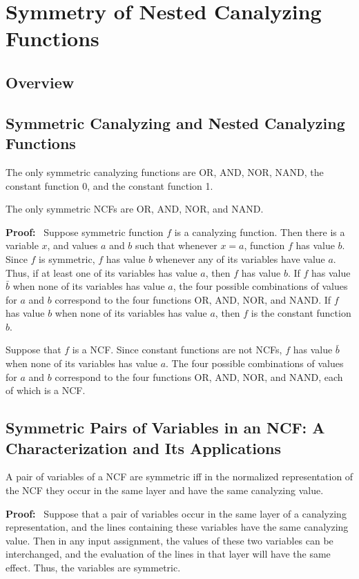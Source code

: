 \section{Symmetry of Nested Canalyzing Functions}
\label{sse:ncf_and_symmetry}

\subsection{Overview}
\label{sse:res_overview}


\subsection{Symmetric Canalyzing and Nested Canalyzing Functions}
\label{sse:sym_and_cf_ncf}

\begin{theorem}\label{thm:ncf_symmetric}
The only symmetric canalyzing functions are OR, AND, NOR, NAND, 
the constant function 0, and the constant function 1.

The only symmetric NCFs are OR, AND, NOR, and NAND.
\end{theorem}
\noindent
\textbf{Proof:}~
Suppose symmetric function $f$ is a canalyzing function. Then there
is a variable $x$, and values $a$ and $b$ such that whenever $x =
a$, function $f$ has value $b$.  Since $f$ is symmetric, $f$  has
value $b$ whenever any of its variables have value $a$.  Thus, if
at least one of its variables has value $a$, then $f$ has value
$b$.  If $f$ has value $\bar{b}$ when none of its variables has
value $a$, the four possible combinations of values for $a$ and $b$
correspond to the four functions OR, AND, NOR, and NAND.  If $f$
has value $b$ when none of its variables has value $a$, then $f$
is the constant function $b$.

Suppose that $f$ is a NCF.  Since constant functions are not NCFs,
$f$ has value $\bar{b}$ when none of its variables has value $a$.
The four possible combinations of values for $a$ and $b$ correspond
to the four functions OR, AND, NOR, and NAND, each of which is a
NCF.  \QED

\subsection{Symmetric Pairs of Variables in an NCF: A Characterization
and Its Applications}
\label{sse:ncf_strong_sym}

\begin{theorem}\label{thm:ncf_symmetric_variables}
A pair of variables of a NCF are symmetric iff
in the normalized representation of the NCF
they occur in the same layer and have the same canalyzing value.
\end{theorem}
\noindent
\textbf{Proof:}~
Suppose that a pair of variables occur in the same layer of a
canalyzing representation, and the lines containing these variables
have the same canalyzing value.  Then in any input assignment, the
values of these two variables can be interchanged, and the evaluation
of the lines in that layer will have the same effect.  Thus, the
variables are symmetric.

